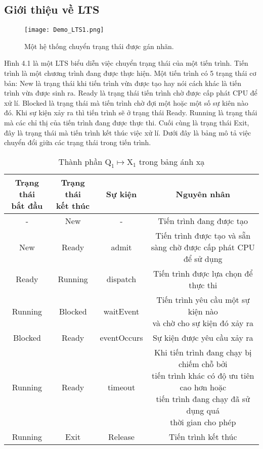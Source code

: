 \documentclass[a4paper,13pt,oneside,openany]{book}
\begin{document}
\begin{flushleft}
	\section{Giới thiệu về LTS}
		\begin{figure}[h]
			\centering
			\texttt{[image: Demo\_LTS1.png]}
			\caption{Một hệ thống chuyển trạng thái được gán nhãn.}
			\label{fig:Demo_LTS1}
		\end{figure}
		\noindent
	Hình 4.1 là một LTS biểu diễn việc chuyển trạng thái của một tiến trình. Tiến trình là một chương trình đang được thực hiện. Một tiến trình có 5 trạng thái cơ bản: New là trạng thái khi tiến trình vừa được tạo hay nói cách khác là tiến trình vừa được sinh ra. Ready là trạng thái tiến trình chờ được cấp phát CPU để xử lí. Blocked là trạng thái mà tiến trình chờ đợi một hoặc một số sự kiên nào đó. Khi sự kiện xảy ra thì tiến trình sẽ ở trạng thái Ready. Running là trạng thái mà các chỉ thị của tiến trình đang được thực thi. Cuối cùng là trạng thái Exit, đây là trạng thái mà tiến trình kết thúc việc xử lí.
	Dưới đây là bảng mô tả việc chuyển đổi giữa các trạng thái trong tiến trình.
	\begin{table}[!ht]
		\centering
		\renewcommand{\arraystretch}{1.25}
		\begin{tabular}{|c|c|c|c|}
			\hline
			 \shortstack{Trạng thái\\bắt đầu} & \shortstack{Trạng thái\\kết thúc} & Sự kiện & Nguyên nhân \\
			\hline
			- & New & - & Tiến trình đang được tạo \\
			\hline
			New & Ready & admit & \shortstack{Tiến trình được tạo và sẵn\\sàng chờ được cấp phát CPU\\ để sử dụng}\\
			\hline
			Ready & Running & dispatch & \shortstack{Tiến trình được lựa chọn để\\thực thi}\\
			\hline
			Running & Blocked & waitEvent & \shortstack{Tiến trình yêu cầu một sự kiện nào\\ và chờ cho sự kiện đó xảy ra}\\
			\hline
			Blocked & Ready & eventOccurs & Sự kiện được yêu cầu xảy ra \\
			\hline
			Running & Ready & timeout & \shortstack{Khi tiến trình đang chạy bị chiếm chỗ bởi\\
			tiến trình khác có độ ưu tiên cao hơn hoặc\\
			tiến trình đang chạy đã sử dụng quá\\ thời gian cho phép}\\
		    \hline
		    Running & Exit & Release & Tiến trình kết thúc\\
		    \hline
		\end{tabular}
		\caption{Thành phần $\textrm{Q}_1 \mapsto \textrm{X}_1$ trong bảng ánh xạ}
	\end{table}

\end{flushleft}
\end{document}
